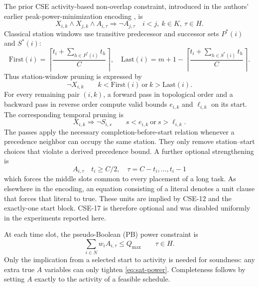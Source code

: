 \documentclass[]{interact}
\theoremstyle{plain}
\theoremstyle{definition}
\theoremstyle{remark}
\newcommand{\Qmax}{Q_{\max}}
\begin{document}
The prior CSE activity-based non-overlap constraint, introduced in the authors' earlier peak-power-minimization encoding \citep{VanKieu2025Compact}, is
\begin{equation}
X_{i,k}\wedge X_{j,k}\wedge A_{i,\tau}\Rightarrow\neg A_{j,\tau}
\quad i<j,\ k\in K,\ \tau\in H.
\tag{CSE-14}
\label{eq:cse14}
\end{equation}
Classical station windows \citep{Scholl2006} use transitive predecessor and successor sets $P^*(i)$ and $S^*(i)$:
\begin{equation}
\mathrm{First}(i)=\left\lceil\frac{t_i+\sum_{h\in P^*(i)}t_h}{C}\right\rceil,
\quad
\mathrm{Last}(i)=m+1-\left\lceil\frac{t_i+\sum_{h\in S^*(i)}t_h}{C}\right\rceil.
\label{eq:first-last}
\end{equation}
Thus station-window pruning is expressed by
\begin{equation}
\neg X_{i,k}
\qquad k<\mathrm{First}(i)\ \text{or}\ k>\mathrm{Last}(i).
\tag{CSE-15}
\end{equation}
For every remaining pair $(i,k)$, a forward pass in topological order and a backward pass in reverse order compute valid bounds $e_{i,k}$ and $\ell_{i,k}$ on its start. The corresponding temporal pruning is
\begin{equation}
X_{i,k}\Rightarrow\neg S_{i,s}
\qquad s<e_{i,k}\ \text{or}\ s>\ell_{i,k}.
\tag{CSE-16}
\end{equation}
The passes apply the necessary completion-before-start relation whenever a precedence neighbor can occupy the same station. They only remove station--start choices that violate a derived precedence bound. A further optional strengthening is
\begin{equation}
A_{i,\tau}
\quad t_i\geq C/2,\quad \tau=C-t_i,\ldots,t_i-1
\tag{CSE-17}
\end{equation}
which forces the middle slots common to every placement of a long task. As elsewhere in the encoding, an equation consisting of a literal denotes a unit clause that forces that literal to true. These units are implied by CSE-12 and the exactly-one start block. CSE-17 is therefore optional and was disabled uniformly in the experiments reported here.

At each time slot, the pseudo-Boolean (PB) power constraint is
\begin{equation}
\sum_{i\in N}w_iA_{i,\tau}\leq\Qmax
\qquad \tau\in H.
\tag{PPC}
\label{eq:sat-power}
\end{equation}
Only the implication from a selected start to activity is needed for soundness: any extra true $A$ variables can only tighten \eqref{eq:sat-power}. Completeness follows by setting $A$ exactly to the activity of a feasible schedule.
\end{document}
